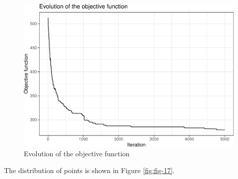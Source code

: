 \documentclass[
  10pt,
  b5paper,
  oneside]{book}
\newenvironment{Shaded}{\begin{snugshade}}{\end{snugshade}}
\newcommand{\AttributeTok}[1]{\textcolor[rgb]{0.77,0.63,0.00}{#1}}
\newcommand{\DecValTok}[1]{\textcolor[rgb]{0.00,0.00,0.81}{#1}}
\newcommand{\DocumentationTok}[1]{\textcolor[rgb]{0.56,0.35,0.01}{\textbf{\textit{#1}}}}
\newcommand{\FunctionTok}[1]{\textcolor[rgb]{0.00,0.00,0.00}{#1}}
\newcommand{\NormalTok}[1]{#1}
\newcommand{\SpecialCharTok}[1]{\textcolor[rgb]{0.00,0.00,0.00}{#1}}
\newcommand{\StringTok}[1]{\textcolor[rgb]{0.31,0.60,0.02}{#1}}
\begin{document}
\begin{figure}
\centering
\includegraphics{Technical-Manual-Soil-Sampling-Design_files/figure-latex/fig-16-1.pdf}
\caption{\label{fig:fig-16}Evolution of the objective function}
\end{figure}

The distribution of points is shown in Figure \ref{fig:fig-17}.

\begin{Shaded}
\end{Shaded}
\end{document}
